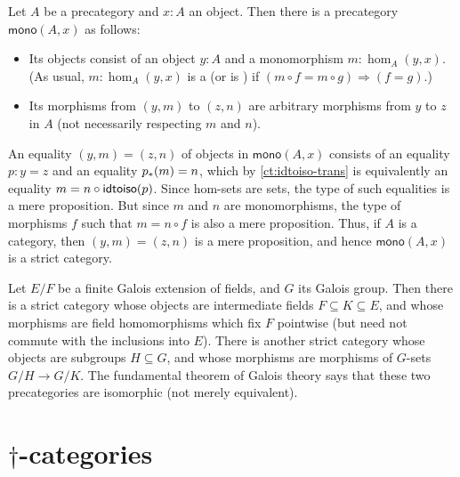 \documentclass[hott-all.tex]{subfiles}
\begin{document}
\begin{eg}\label{ct:mono-cat}
  Let $A$ be a precategory and $x:A$ an object.
  Then there is a precategory $\mathsf{mono}(A,x)$ as follows:
  \begin{itemize}
  \item Its objects consist of an object $y:A$ and a monomorphism $m:\hom_A(y,x)$.
    (As usual, $m:\hom_A(y,x)$ is a  (or is ) if $(m\circ f = m\circ g) \Rightarrow (f=g)$.)
  \item Its morphisms from $(y,m)$ to $(z,n)$ are arbitrary morphisms from $y$ to $z$ in $A$ (not necessarily respecting $m$ and $n$).
  \end{itemize}
  An equality $(y,m)=(z,n)$ of objects in $\mathsf{mono}(A,x)$ consists of an equality $p:y=z$ and an equality ${p}_{*}\mathopen{}\left({m}\right)\mathclose{}=n$, which by \cref{ct:idtoiso-trans} is equivalently an equality $m=n\circ \mathsf{idtoiso}(p)$.
  Since hom-sets are sets, the type of such equalities is a mere proposition.
  But since $m$ and $n$ are monomorphisms, the type of morphisms $f$ such that $m = n\circ f$ is also a mere proposition.
  Thus, if $A$ is a category, then $(y,m)=(z,n)$ is a mere proposition, and hence $\mathsf{mono}(A,x)$ is a strict category.
\end{eg}


\begin{eg}\label{ct:galois}
  Let $E/F$ be a finite Galois extension
  of fields, and $G$ its Galois group.
  Then there is a strict category whose objects are intermediate fields $F\subseteq K\subseteq E$, and whose morphisms are field homomorphisms which fix $F$ pointwise (but need not commute with the inclusions into $E$).
  There is another strict category whose objects are subgroups $H\subseteq G$, and whose morphisms are morphisms of $G$-sets $G/H \to G/K$.
  The fundamental theorem of Galois theory
  says that these two precategories are isomorphic (not merely equivalent).
\end{eg}


\section{\texorpdfstring{$\dagger$}{†}-categories}
\label{sec:dagger-categories}
\end{document}
